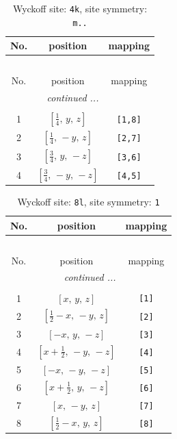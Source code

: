 \documentclass[fleqn,8pt]{jsarticle}
\begin{document}
\renewcommand{\arraystretch}{1.2}
\begin{longtable}{ccc}
\caption{Wyckoff site: {\tt 4k}, site symmetry: {\tt m..}}
 \\
 \hline \hline
No. & position & mapping \\ \hline \endfirsthead

\multicolumn{2}{l}{\tablename\ \thetable{}} \\
 \hline \hline
No. & position & mapping \\ \hline \endhead

 \hline \hline
\multicolumn{2}{r}{\footnotesize\it continued ...} \\ \endfoot

 \hline \hline
\multicolumn{2}{r}{} \\ \endlastfoot

1 & $\left[ \frac{1}{4},\, y,\, z \right]$ & {\tt [1,8]} \\ \hline
2 & $\left[ \frac{1}{4},\, - y,\, z \right]$ & {\tt [2,7]} \\ \hline
3 & $\left[ \frac{3}{4},\, y,\, - z \right]$ & {\tt [3,6]} \\ \hline
4 & $\left[ \frac{3}{4},\, - y,\, - z \right]$ & {\tt [4,5]} \\
\end{longtable}
\renewcommand{\arraystretch}{1.2}
\begin{longtable}{ccc}
\caption{Wyckoff site: {\tt 8l}, site symmetry: {\tt 1}}
 \\
 \hline \hline
No. & position & mapping \\ \hline \endfirsthead

\multicolumn{2}{l}{\tablename\ \thetable{}} \\
 \hline \hline
No. & position & mapping \\ \hline \endhead

 \hline \hline
\multicolumn{2}{r}{\footnotesize\it continued ...} \\ \endfoot

 \hline \hline
\multicolumn{2}{r}{} \\ \endlastfoot

1 & $\left[ x,\, y,\, z \right]$ & {\tt [1]} \\ \hline
2 & $\left[ \frac{1}{2} - x,\, - y,\, z \right]$ & {\tt [2]} \\ \hline
3 & $\left[ - x,\, y,\, - z \right]$ & {\tt [3]} \\ \hline
4 & $\left[ x + \frac{1}{2},\, - y,\, - z \right]$ & {\tt [4]} \\ \hline
5 & $\left[ - x,\, - y,\, - z \right]$ & {\tt [5]} \\ \hline
6 & $\left[ x + \frac{1}{2},\, y,\, - z \right]$ & {\tt [6]} \\ \hline
7 & $\left[ x,\, - y,\, z \right]$ & {\tt [7]} \\ \hline
8 & $\left[ \frac{1}{2} - x,\, y,\, z \right]$ & {\tt [8]} \\
\end{longtable}
\end{document}
